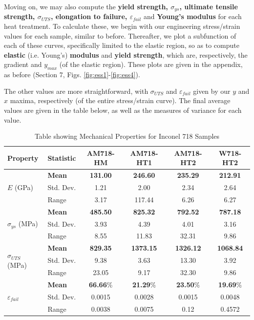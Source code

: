 \documentclass{article}
\begin{document}
Moving on, we may also compute the \textbf{yield strength, $\sigma_{ys}$, ultimate tensile strength, $\sigma_{UTS}$, elongation to failure, $\varepsilon_{fail}$} and \textbf{Young's modulus} for each heat treatment. To calculate these, we begin with our engineering stress/strain values for each sample, similar to before. Thereafter, we plot a subfunction of each of these curves, specifically limited to the elastic region, so as to compute \textbf{elastic} (i.e. Young's) \textbf{modulus} and \textbf{yield strength}, which are, respectively, the gradient and $y_{max}$ (of the elastic region). These plots are given in the appendix, as before (Section 7, Figs. \ref{fig:ess1}-\ref{fig:ess4}).

The other values are more straightforward, with $\sigma_{UTS}$ and $\varepsilon_{fail}$ given by our $y$ and $x$ maxima, respectively (of the entire stress/strain curve). The final average values are given in the table below, as well as the measures of variance for each value.

\begin{table}[H]
	\centering
	\footnotesize
	\caption{Table showing Mechanical Properties for Inconel 718 Samples}
	\vspace{0.5em}
	\label{tab:mechstats}
	\begin{tabular}{llcccc}
		\hline
		\textbf{Property} & \textbf{Statistic} & \textbf{AM718-HM} & \textbf{AM718-HT1} & \textbf{AM718-HT2} & \textbf{W718-HT2} \\
		\hline
		\multirow{3}{*}{$E$ (GPa)}
		& \textbf{Mean}     & \textbf{131.00} & \textbf{246.60} & \textbf{235.29} & \textbf{212.91} \\
		& Std. Dev.& 1.21   & 2.00   & 2.34   & 2.64   \\
		& Range    & 3.17   & 117.44 & 6.26   & 6.27 \\
		\hline
		\multirow{3}{*}{$\sigma_{ys}$ (MPa)}
		& \textbf{Mean}     & \textbf{485.50}  & \textbf{825.32}  & \textbf{792.52}  & \textbf{787.18}  \\
		& Std. Dev.& 3.93   & 4.39   & 4.01   & 3.16  \\
		& Range    & 8.55   & 11.83  & 32.31   & 9.86  \\
		\hline
		\multirow{3}{*}{$\sigma_{UTS}$ (MPa)}
		& \textbf{Mean}     & \textbf{829.35}  & \textbf{1373.15} & \textbf{1326.12} & \textbf{1068.84} \\
		& Std. Dev.& 9.38   & 3.63   & 13.30  & 3.92   \\
		& Range    & 23.05  & 9.17  & 32.30   & 9.86  \\
		\hline
		\multirow{3}{*}{$\varepsilon_{fail}$}
		& \textbf{Mean}     & \textbf{66.66}\% & \textbf{21.29}\% & \textbf{23.50}\% & \textbf{19.69}\% \\
		& Std. Dev.& 0.0015  & 0.0028  & 0.0015  & 0.0048  \\
		& Range    & 0.0038  & 0.0075  & 0.12  & 0.4572  \\
		\hline
	\end{tabular}
\end{table}
\end{document}
